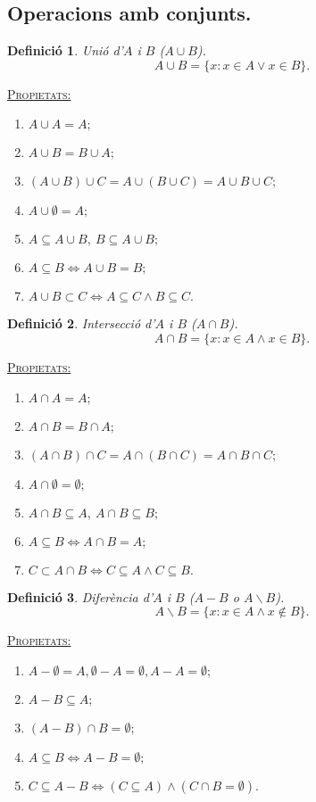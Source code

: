 \documentclass[11pt]{article}
\newcommand{\propietats}{\underline{{\scshape Propietats:}}}
\newtheorem{defi}{Definició}[section]
\begin{document}
\subsection{Operacions amb conjunts.}
\begin{defi}
Unió d'$A$ i $B$ ($A\cup B$).
$$A\cup B=\{x:x\in A\vee x\in B\}.$$
\end{defi}
\noindent\propietats
\begin{enumerate}
	\item $A\cup A=A;$
	\item $A\cup B=B\cup A;$
	\item $(A\cup B)\cup C=A\cup (B\cup C)=A\cup B\cup C;$
	\item $A\cup\emptyset=A;$
	\item $A\subseteq A\cup B, \ B\subseteq A\cup B;$
	\item $A\subseteq B\iff A\cup B=B;$
	\item $A\cup B\subset C\iff A\subseteq C\wedge B\subseteq C.$
\end{enumerate}
\begin{defi}
Intersecció d'$A$ i $B$ ($A\cap B$).
$$A\cap B=\{x:x\in A\wedge x\in B\}.$$
\end{defi}
\noindent\propietats
\begin{enumerate}
	\item $A\cap A=A;$
	\item $A\cap B=B\cap A;$
	\item $(A\cap B)\cap C=A\cap (B\cap C)=A\cap B\cap C;$
	\item $A\cap\emptyset=\emptyset;$
	\item $A\cap B\subseteq A, \ A\cap B\subseteq B;$
	\item $A\subseteq B\iff A\cap B=A;$
	\item $C\subset A\cap B\iff C\subseteq A\wedge C\subseteq B.$
\end{enumerate}
\begin{defi}
Diferència d'$A$ i $B$ ($A-B$ o $A\backslash B$).
$$A\backslash B=\{x:x\in A\wedge x\not\in B\}.$$
\end{defi}
\noindent\propietats
\begin{enumerate}
	\item $A-\emptyset=A,\emptyset-A=\emptyset,A-A=\emptyset;$
	\item $A-B\subseteq A;$
	\item $(A-B)\cap B=\emptyset;$
	\item $A\subseteq B\iff A-B=\emptyset;$
	\item $C\subseteq A-B\iff (C\subseteq A)\wedge(C\cap B=\emptyset).$
\end{enumerate}
\end{document}
